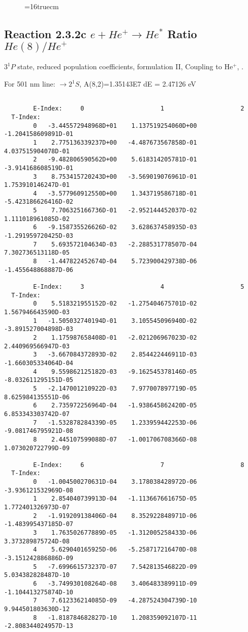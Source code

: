\documentclass[12pt,dvipdfmx]{article}
\begin{document}
\begin{figure} \label{2.3.2b}
\epsfxsize=16truecm
\end{figure}
\newpage


\subsection{
  Reaction 2.3.2c $e + He^+ \rightarrow He^*  $ Ratio $He(8)/He^+$
}

  $3^1P$ state,
  reduced population coefficients, formulation II,
  Coupling to He$^+$, \cite{kn:Fujimoto}.

  For 501 nm line: $\rightarrow 2^1S$, A(8,2)=1.35143E7 dE = 2.47126 eV

\begin{small}\begin{verbatim}

        E-Index:     0                     1                     2
  T-Index:
        0   -3.445572948968D+01    1.137519254060D+00   -1.204158609891D-01
        1    2.775136339237D+00   -4.487673567858D-01    4.037515904078D-01
        2   -9.482806590562D+00    5.618314205781D-01   -3.914168608519D-01
        3    8.753415720243D+00   -3.569019076961D-01    1.753910146247D-01
        4   -3.577960912550D+00    1.343719586718D-01   -5.423186626416D-02
        5    7.706325166736D-01   -2.952144452037D-02    1.111018961085D-02
        6   -9.158735526626D-02    3.628637458935D-03   -1.291959720425D-03
        7    5.693572104634D-03   -2.288531778507D-04    7.302736513118D-05
        8   -1.447822452674D-04    5.723900429738D-06   -1.455648868887D-06

        E-Index:     3                     4                     5
  T-Index:
        0    5.518321955152D-02   -1.275404675701D-02    1.567946643590D-03
        1   -1.505032740194D-01    3.105545096940D-02   -3.891527004898D-03
        2    1.175987658408D-01   -2.021206967023D-02    2.440969566947D-03
        3   -3.667084372893D-02    2.854422446911D-03   -1.660305334064D-04
        4    9.559862125182D-03   -9.162545378146D-05   -8.032611295151D-05
        5   -2.147001210922D-03    7.977007897719D-05    8.625984135551D-06
        6    2.735972256964D-04   -1.938645862420D-05    6.853343303742D-07
        7   -1.532878284339D-05    1.233959442253D-06   -9.081746795921D-08
        8    2.445107599088D-07   -1.001706708366D-08    1.073020722799D-09

        E-Index:     6                     7                     8
  T-Index:
        0   -1.004500270631D-04    3.178038428972D-06   -3.936121532969D-08
        1    2.854040739913D-04   -1.113667661675D-05    1.772401326973D-07
        2   -1.919209138406D-04    8.352922848971D-06   -1.483995437185D-07
        3    1.763502677889D-05   -1.312005258433D-06    3.373289875724D-08
        4    5.629040165925D-06   -5.258717216470D-08   -3.151242886886D-09
        5   -7.699661573237D-07    7.542813546822D-09    5.034382828487D-10
        6   -3.749930108264D-08    3.406483389911D-09   -1.104413275874D-10
        7    7.612336214085D-09   -4.287524304739D-10    9.944501803630D-12
        8   -1.818784682827D-10    1.208359092107D-11   -2.808344024957D-13


\end{verbatim}
\end{small}
\end{document}
